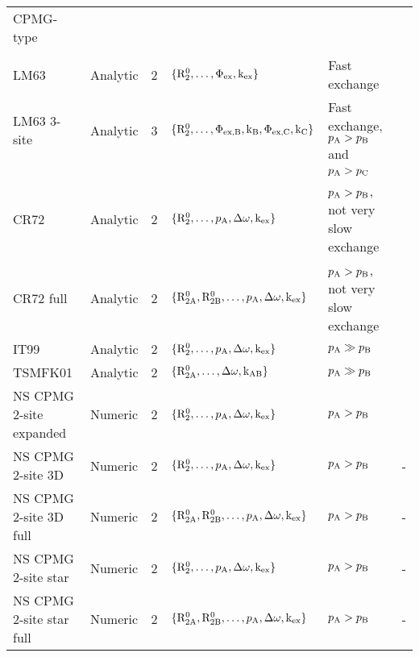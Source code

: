 \begin{landscape}
\begin{center}
\begin{small}
\begin{longtable}{llllll}
\\[-5pt]
CPMG-type \\
\cline{1-1}
\\[-5pt]
LM63                     & Analytic & 2     & $\{\mathrm{R}_2^0, \dots, \Phi_\textrm{ex}, \textrm{k}_\textrm{ex}\}$                & Fast exchange                     & \citet{LuzMeiboom63} \\
LM63 3-site              & Analytic & 3     & $\{\mathrm{R}_2^0, \dots, \Phi_\textrm{ex,B}, \textrm{k}_\textrm{B}, \Phi_\textrm{ex,C}, \textrm{k}_\textrm{C}\}$  & Fast exchange, $p_\textrm{A} > p_\textrm{B}$ and    & \citet{LuzMeiboom63} \\
                         &          &       &                                                     & $p_\textrm{A} > p_\textrm{C}$ \\
CR72                     & Analytic & 2     & $\{\mathrm{R}_2^0, \dots, p_\textrm{A}, \Delta\omega, \textrm{k}_\textrm{ex}\}$              & $p_\textrm{A} > p_\textrm{B}$, not very slow exchange & \citet{CarverRichards72} \\
CR72 full                & Analytic & 2     & $\{\mathrm{R}_\mathrm{2A}^0, \mathrm{R}_\mathrm{2B}^0, \dots, p_\textrm{A}, \Delta\omega, \textrm{k}_\textrm{ex}\}$ & $p_\textrm{A} > p_\textrm{B}$, not very slow exchange & \citet{CarverRichards72} \\
IT99                     & Analytic & 2     & $\{\mathrm{R}_2^0, \dots, p_\textrm{A}, \Delta\omega, \textrm{k}_\textrm{ex}\}$              & $p_\textrm{A} \gg p_\textrm{B}$                     & \citet{IshimaTorchia99} \\
TSMFK01                  & Analytic & 2     & $\{\mathrm{R}_\mathrm{2A}^0, \dots, \Delta\omega, \textrm{k}_\textrm{AB}\}$                  & $p_\textrm{A} \gg p_\textrm{B}$                     & \citet{Tollinger01} \\
NS CPMG 2-site expanded  & Numeric  & 2     & $\{\mathrm{R}_2^0, \dots, p_\textrm{A}, \Delta\omega, \textrm{k}_\textrm{ex}\}$              & $p_\textrm{A} > p_\textrm{B}$                       & \citet{Tollinger01} \\
NS CPMG 2-site 3D        & Numeric  & 2     & $\{\mathrm{R}_2^0, \dots, p_\textrm{A}, \Delta\omega, \textrm{k}_\textrm{ex}\}$              & $p_\textrm{A} > p_\textrm{B}$                       & - \\
NS CPMG 2-site 3D full   & Numeric  & 2     & $\{\mathrm{R}_\mathrm{2A}^0, \mathrm{R}_\mathrm{2B}^0, \dots, p_\textrm{A}, \Delta\omega, \textrm{k}_\textrm{ex}\}$ & $p_\textrm{A} > p_\textrm{B}$                       & - \\
NS CPMG 2-site star      & Numeric  & 2     & $\{\mathrm{R}_2^0, \dots, p_\textrm{A}, \Delta\omega, \textrm{k}_\textrm{ex}\}$              & $p_\textrm{A} > p_\textrm{B}$                       & - \\
NS CPMG 2-site star full & Numeric  & 2     & $\{\mathrm{R}_\mathrm{2A}^0, \mathrm{R}_\mathrm{2B}^0, \dots, p_\textrm{A}, \Delta\omega, \textrm{k}_\textrm{ex}\}$ & $p_\textrm{A} > p_\textrm{B}$                       & - \\


\end{longtable}
\end{small}
\end{center}
\end{landscape}
